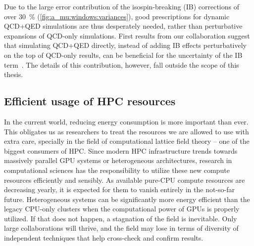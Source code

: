 Due to the large error contribution of the isospin-breaking (IB) corrections of over \SI{30}{\percent} (\cref{fig:a_mu:windows:variances}), good prescriptions for dynamic QCD+QED simulations are thus desperately needed, rather than perturbative expansions of QCD-only simulations.
First results from our collaboration suggest that simulating QCD+QED directly, instead of adding IB effects perturbatively on the top of QCD-only results, can be beneficial for the uncertainty of the IB term~.
The details of this contribution, however, fall outside the scope of this thesis.

\subsection{Efficient usage of HPC resources}

In the current world, reducing energy consumption is more important than ever.
This obligates us as researchers to treat the resources we are allowed to use with extra care, specially in the field of computational lattice field theory -- one of the biggest consumers of HPC.
Since modern HPC infrastructure trends towards massively parallel GPU systems or heterogeneous architectures, research in computational sciences has the responsibility to utilize these new compute resources efficiently and sensibly.
As available pure-CPU compute resources are decreasing yearly, it is expected for them to vanish entirely in the not-so-far future.
Heterogeneous systems can be significantly more energy efficient than the legacy CPU-only clusters when the computational power of GPUs is properly utilized.
If that does not happen, a stagnation of the field is inevitable.
Only large collaborations will thrive, and the field may lose in terms of diversity of independent techniques that help cross-check and confirm results.


